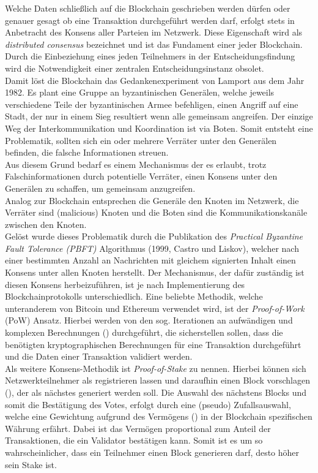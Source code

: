 Welche Daten schließlich auf die Blockchain geschrieben werden dürfen oder genauer gesagt ob eine Transaktion durchgeführt werden darf, erfolgt stets in Anbetracht des Konsens aller Parteien im Netzwerk. Diese Eigenschaft wird als \textit{distributed consensus} bezeichnet und ist das Fundament einer jeder Blockchain. Durch die Einbeziehung eines jeden Teilnehmers in der Entscheidungsfindung wird die Notwendigkeit einer zentralen Entscheidungsinstanz obsolet. \\
Damit löst die Blockchain das Gedankenexperiment von Lamport aus dem Jahr 1982. Es plant eine Gruppe an byzantinischen Generälen, welche jeweils verschiedene Teile der byzantinischen Armee befehligen, einen Angriff auf eine Stadt, der nur in einem Sieg resultiert wenn alle gemeinsam angreifen. Der einzige Weg der Interkommunikation und Koordination ist via Boten. Somit entsteht eine Problematik, sollten sich ein oder mehrere Verräter unter den Generälen befinden, die falsche Informationen streuen.\\
Aus diesem Grund bedarf es einem Mechanismus der es erlaubt, trotz Falschinformationen durch potentielle Verräter, einen Konsens unter den Generälen zu schaffen, um gemeinsam anzugreifen. \\
Analog zur Blockchain entsprechen die Generäle den Knoten im Netzwerk, die Verräter sind  (malicious) Knoten und die Boten sind die Kommunikationskanäle zwischen den Knoten.\\
Gelöst wurde dieses Problematik durch die Publikation des \textit{Practical Byzantine Fault Tolerance (PBFT)} Algorithmus (1999, Castro und Liskov), welcher nach einer bestimmten Anzahl an Nachrichten mit gleichem signierten Inhalt einen Konsens unter allen Knoten herstellt.   
Der Mechanismus, der dafür zuständig ist diesen Konsens herbeizuführen, ist je nach Implementierung des Blockchainprotokolls unterschiedlich. Eine beliebte Methodik, welche unteranderem von Bitcoin und Ethereum verwendet wird, ist der  \textit{Proof-of-Work} (PoW) Ansatz. Hierbei werden von den sog.  Iterationen an aufwändigen und komplexen Berechnungen () durchgeführt, die sicherstellen sollen, dass die benötigten kryptographischen Berechnungen für eine Transaktion durchgeführt und die Daten einer Transaktion validiert werden.\\
Als weitere Konsens-Methodik ist \textit{Proof-of-Stake} zu nennen. Hierbei  können sich Netzwerkteilnehmer als  registrieren lassen und daraufhin einen Block vorschlagen (), der als nächstes generiert werden soll. Die Auswahl des nächstens Blocks und somit die Bestätigung des Votes, erfolgt durch eine (pseudo) Zufallsauswahl, welche eine Gewichtung aufgrund des Vermögens () in der Blockchain spezifischen Währung erfährt. Dabei ist das Vermögen proportional zum Anteil der Transaktionen, die ein Validator bestätigen kann. Somit ist es um so wahrscheinlicher, dass ein Teilnehmer einen Block generieren darf, desto höher sein Stake ist. \\

